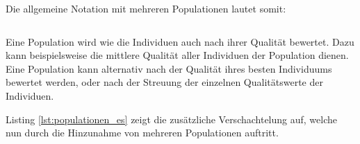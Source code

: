 Die allgemeine Notation mit mehreren Populationen lautet somit:

\begin{equation}
[\mu_p \# \lambda_p (\mu_i \# \lambda_i)]
\end{equation}

Eine Population wird wie die Individuen auch nach ihrer Qualität bewertet.
Dazu kann beispielsweise die mittlere Qualität aller Individuen der Population dienen.
Eine Population kann alternativ nach der Qualität ihres besten Individuums bewertet werden, oder nach der Streuung der einzelnen Qualitätswerte der Individuen.

Listing \ref{lst:populationen_es} zeigt die zusätzliche Verschachtelung auf, welche nun durch die Hinzunahme von mehreren Populationen auftritt. 

